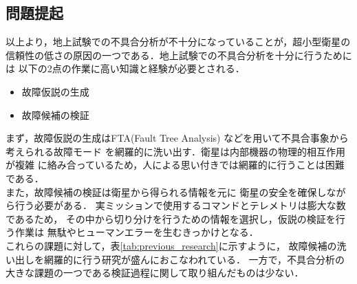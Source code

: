 \documentclass[11pt]{jsarticle}%
\begin{document}
\begin{multicols}{2}
  \subsection{問題提起}
  \vspace{-1zh}
  以上より，地上試験での不具合分析が不十分になっていることが，超小型衛星の
  信頼性の低さの原因の一つである．地上試験での不具合分析を十分に行うためには
  以下の2点の作業に高い知識と経験が必要とされる．
  \begin{itemize}
    \item 故障仮説の生成
    \item 故障候補の検証%
  \end{itemize}
  まず，故障仮説の生成はFTA(Fault Tree Analysis)%
  などを用いて不具合事象から考えられる故障モード
  を網羅的に洗い出す．衛星は内部機器の物理的相互作用が複雑
  に絡み合っているため，人による思い付きでは網羅的に行うことは困難である．\\
  また，故障候補の検証は衛星から得られる情報を元に
  衛星の安全を確保しながら行う必要がある．
  実ミッションで使用するコマンドとテレメトリは膨大な数であるため，
その中から切り分けを行うための情報を選択し，仮説の検証を行う作業は
無駄やヒューマンエラーを生むきっかけとなる．\\
これらの課題に対して，表\ref{tab:previous_research}に示すように，
故障候補の洗い出しを網羅的に行う研究が盛んにおこなわれている．
一方で，不具合分析の大きな課題の一つである検証過程に関して取り組んだものは少ない．
\vspace{-1zh}
\begin{table}[H]
  \centering
  \caption{不具合分析手法の比較}
  \label{tab:previous_research}
\end{table}
\vspace{-1zh}

\end{multicols}
\end{document}
